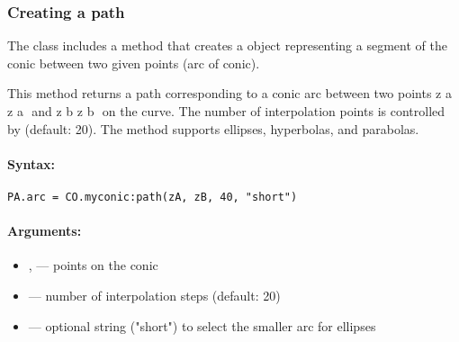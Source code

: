 \vspace{1em}


\begin{minipage}{.3\textwidth}
\end{minipage}
\begin{minipage}{.7\textwidth}
\begin{tkzexample}
\end{tkzexample}
\end{minipage}


\subsubsection{Creating a path} %
\label{ssub:conic_path}

The  class includes a method  that creates a  object representing a segment of the conic between two given points (arc of conic).

This method returns a path corresponding to a conic arc between two points
z
a
z
a
​
  and
z
b
z
b
​
 on the curve. The number of interpolation points is controlled by  (default: 20). The method supports ellipses, hyperbolas, and parabolas.

\paragraph{Syntax:}
\begin{verbatim}
PA.arc = CO.myconic:path(zA, zB, 40, "short")
\end{verbatim}

\paragraph{Arguments:}
\begin{itemize}
\item {},  — points on the conic
\item {} — number of interpolation steps (default: 20)
\item {} — optional string ("short") to select the smaller arc for ellipses
\end{itemize}

